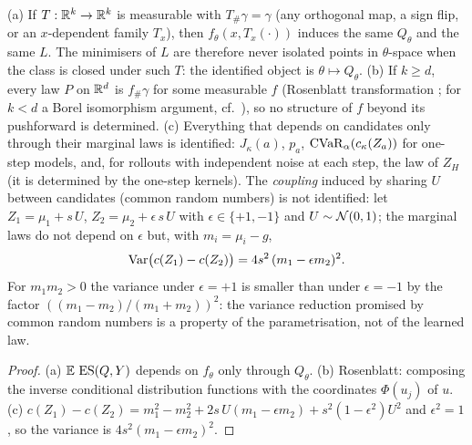 \begin{proposition}\label{prop:noisemap}
(a) If $T:\mathbb{R}^k\to\mathbb{R}^k$ is measurable with $T_\#\gamma=\gamma$ (any orthogonal map, a sign flip, or an $x$-dependent family $T_x$), then $f_\theta(x,T_x(\cdot))$ induces the same $Q_\theta$ and the same $L$. The minimisers of $L$ are therefore never isolated points in $\theta$-space when the class is closed under such $T$: the identified object is $\theta\mapsto Q_\theta$.
(b) If $k\ge d$, every law $P$ on $\mathbb{R}^d$ is $f_\#\gamma$ for some measurable $f$ (Rosenblatt transformation \cite{rosenblatt1952}; for $k<d$ a Borel isomorphism argument, cf.\ \cite{kallenberg2002}), so no structure of $f$ beyond its pushforward is determined.
(c) Everything that depends on candidates only through their marginal laws is identified: $J_\kappa(a)$, $p_a$, $\operatorname{CVaR}_\alpha(c_\kappa(Z_a))$ for one-step models, and, for rollouts with independent noise at each step, the law of $Z_H$ (it is determined by the one-step kernels). The \emph{coupling} induced by sharing $U$ between candidates (common random numbers) is not identified:
let $Z_1=\mu_1+s\,U$, $Z_2=\mu_2+\epsilon\,s\,U$ with $\epsilon\in\{+1,-1\}$ and $U\sim\mathcal{N}(0,1)$; the marginal laws do not depend on $\epsilon$ but, with $m_i=\mu_i-g$,
\[
\operatorname{Var}\bigl(c(Z_1)-c(Z_2)\bigr)=4s^2\,(m_1-\epsilon m_2)^2 .
\]
For $m_1m_2>0$ the variance under $\epsilon=+1$ is smaller than under $\epsilon=-1$ by the factor $((m_1-m_2)/(m_1+m_2))^2$: the variance reduction promised by common random numbers is a property of the parametrisation, not of the learned law.
\end{proposition}
\begin{proof}
(a) $\mathbb{E}\,\operatorname{ES}(Q,Y)$ depends on $f_\theta$ only through $Q_\theta$. (b) Rosenblatt: composing the inverse conditional distribution functions with the coordinates $\Phi(u_j)$ of $u$. (c) $c(Z_1)-c(Z_2)=m_1^2-m_2^2+2s\,U(m_1-\epsilon m_2)+s^2(1-\epsilon^2)U^2$ and $\epsilon^2=1$, so the variance is $4s^2(m_1-\epsilon m_2)^2$.
\end{proof}

